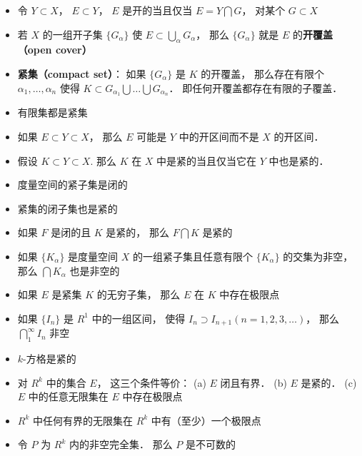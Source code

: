\begin{itemize}
\item 令 $Y \subset X$， $E \subset Y$， $E$ 是开的当且仅当 $E = Y \bigcap G$， 对某个 $G \subset X$

\item 若 $X$ 的一组开子集 $\{G_\alpha\}$ 使 $E \subset \bigcup_\alpha G_\alpha$， 那么 $\{G_\alpha\}$ 就是 $E$ 的\textbf{开覆盖（open cover）}

\item \textbf{紧集（compact set）}： 如果 $\{G_\alpha\}$ 是 $K$ 的开覆盖， 那么存在有限个 $\alpha_1,\dots, \alpha_n$ 使得 $K \subset G_{\alpha_1} \bigcup \dots \bigcup G_{\alpha_n}$． 即任何开覆盖都存在有限的子覆盖．

\item 有限集都是紧集

\item 如果 $E \subset Y \subset X$， 那么 $E$ 可能是 $Y$ 中的开区间而不是 $X$ 的开区间．

\item 假设 $K \subset Y \subset X$. 那么 $K$ 在 $X$ 中是紧的当且仅当它在 $Y$ 中也是紧的．

\item 度量空间的紧子集是闭的

\item 紧集的闭子集也是紧的

\item 如果 $F$ 是闭的且 $K$ 是紧的， 那么 $F \bigcap K$ 是紧的

\item 如果 $\{K_\alpha\}$ 是度量空间 $X$ 的一组紧子集且任意有限个 $\{K_\alpha\}$ 的交集为非空， 那么 $\bigcap K_\alpha$ 也是非空的
\item 如果 $E$ 是紧集 $K$ 的无穷子集， 那么 $E$ 在 $K$ 中存在极限点

\item 如果 $\{I_n\}$ 是 $R^1$ 中的一组区间， 使得 $I_n \supset I_{n+1} (n = 1, 2, 3,\dots)$， 那么 $\bigcap_1^\infty I_n$ 非空

\item $k$-方格是紧的

\item 对 $R^k$ 中的集合 $E$， 这三个条件等价： (a) $E$ 闭且有界． (b) $E$ 是紧的． (c) $E$ 中的任意无限集在 $E$ 中存在极限点

\item $R^k$ 中任何有界的无限集在 $R^k$ 中有（至少）一个极限点

\item 令 $P$ 为 $R^k$ 内的非空完全集． 那么 $P$ 是不可数的


\end{itemize}
